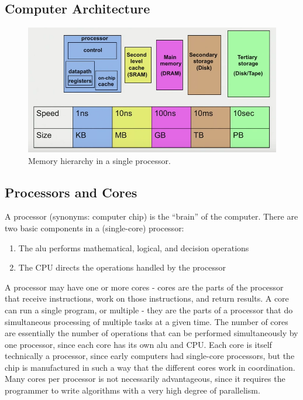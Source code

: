 \documentclass[10pt]{article}
\begin{document}
\begin{flushleft}
\section{Computer Architecture}

\begin{figure}[H]
\centering
\includegraphics[width=0.75\linewidth]{figures/memory-heirarchy.pdf}
\caption{Memory hierarchy in a single processor.}
\end{figure}

\subsection{Processors and Cores}
A processor (synonyms: computer chip) is the ``brain'' of the computer. There are two basic components in a (single-core) processor:

\begin{enumerate}
\item The \gls{alu} performs mathematical, logical, and decision operations
\item The CPU directs the operations handled by the processor
\end{enumerate}

A processor may have one or more cores - cores are the parts of the processor that receive instructions, work on those instructions, and return results. A core can run a single program, or multiple - they are the parts of a processor that do simultaneous processing of multiple tasks at a given time. The number of cores are essentially the number of operations that can be performed simultaneously by one processor, since each core has its own \gls{alu} and CPU. Each core is itself technically a processor, since early computers had single-core processors, but the chip is manufactured in such a way that the different cores work in coordination. Many cores per processor is not necessarily advantageous, since it requires the programmer to write algorithms with a very high degree of parallelism.


\end{flushleft}
\end{document}
